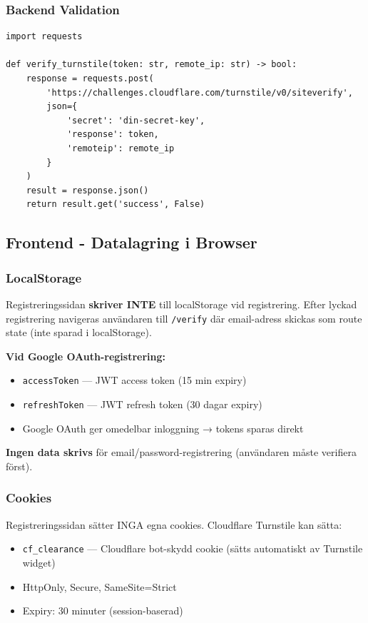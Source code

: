 \documentclass[12pt,a4paper]{article}
\begin{document}
\subsubsection{Backend Validation}
\begin{lstlisting}
import requests

def verify_turnstile(token: str, remote_ip: str) -> bool:
    response = requests.post(
        'https://challenges.cloudflare.com/turnstile/v0/siteverify',
        json={
            'secret': 'din-secret-key',
            'response': token,
            'remoteip': remote_ip
        }
    )
    result = response.json()
    return result.get('success', False)
\end{lstlisting}

\subsection{Frontend - Datalagring i Browser}

\subsubsection{LocalStorage}
Registreringssidan \textbf{skriver INTE} till localStorage vid registrering. Efter lyckad registrering navigeras användaren till \texttt{/verify} där email-adress skickas som route state (inte sparad i localStorage).

\textbf{Vid Google OAuth-registrering:}
\begin{itemize}[noitemsep]
  \item \texttt{accessToken} — JWT access token (15 min expiry)
  \item \texttt{refreshToken} — JWT refresh token (30 dagar expiry)
  \item Google OAuth ger omedelbar inloggning → tokens sparas direkt
\end{itemize}

\textbf{Ingen data skrivs} för email/password-registrering (användaren måste verifiera först).

\subsubsection{Cookies}
Registreringssidan sätter INGA egna cookies. Cloudflare Turnstile kan sätta:
\begin{itemize}[noitemsep]
  \item \texttt{cf\_clearance} — Cloudflare bot-skydd cookie (sätts automatiskt av Turnstile widget)
  \item HttpOnly, Secure, SameSite=Strict
  \item Expiry: 30 minuter (session-baserad)
\end{itemize}
\end{document}
